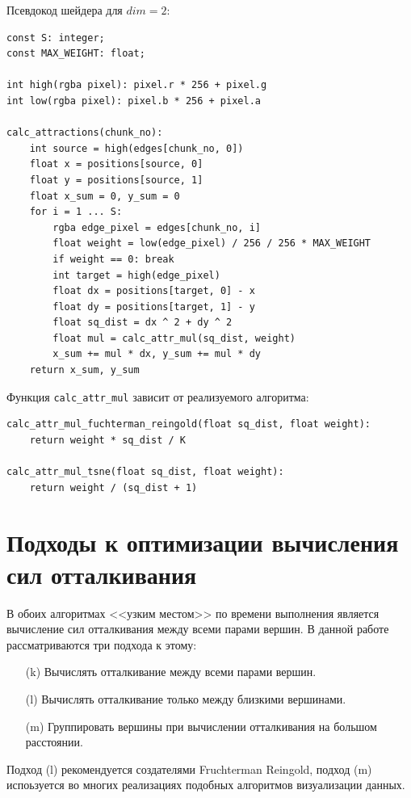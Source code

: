Псевдокод шейдера для $dim = 2$:

\begin{verbatim}
const S: integer;
const MAX_WEIGHT: float;

int high(rgba pixel): pixel.r * 256 + pixel.g
int low(rgba pixel): pixel.b * 256 + pixel.a

calc_attractions(chunk_no):
    int source = high(edges[chunk_no, 0])
    float x = positions[source, 0]
    float y = positions[source, 1]
    float x_sum = 0, y_sum = 0
    for i = 1 ... S:
        rgba edge_pixel = edges[chunk_no, i]
        float weight = low(edge_pixel) / 256 / 256 * MAX_WEIGHT
        if weight == 0: break
        int target = high(edge_pixel)
        float dx = positions[target, 0] - x
        float dy = positions[target, 1] - y
        float sq_dist = dx ^ 2 + dy ^ 2
        float mul = calc_attr_mul(sq_dist, weight)
        x_sum += mul * dx, y_sum += mul * dy
    return x_sum, y_sum
\end{verbatim}

Функция \texttt{calc\_attr\_mul} зависит от реализуемого алгоритма:

\begin{verbatim}
calc_attr_mul_fuchterman_reingold(float sq_dist, float weight):
    return weight * sq_dist / K

calc_attr_mul_tsne(float sq_dist, float weight):
    return weight / (sq_dist + 1)
\end{verbatim}

\section{Подходы к оптимизации вычисления сил отталкивания}


В обоих алгоритмах <<узким местом>> по времени выполнения является вычисление сил отталкивания между всеми парами вершин. В данной работе рассматриваются три подхода к этому:

\begin{itemize}
\item[(k)] Вычислять отталкивание между всеми парами вершин.
\item[(l)] Вычислять отталкивание только между близкими вершинами.
\item[(m)] Группировать вершины при вычислении отталкивания на большом расстоянии.
\end{itemize}

Подход (l) рекомендуется создателями Fruchterman Reingold, подход (m) испоьзуется во многих реализациях подобных алгоритмов визуализации данных.

